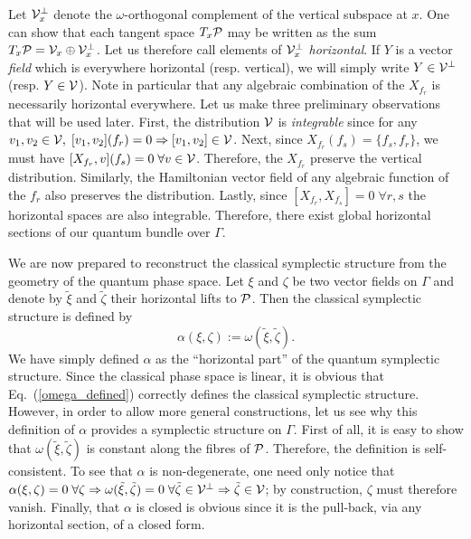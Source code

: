 \documentclass[12pt,aps,eqsecnum,tighten,nofootinbib]{revtex4-2}
\def\be{\begin{equation}}
\def\ee{\end{equation}}
\def\a{\alpha}
\def\P{{\cal P}}
\def\w{\omega}
\def\implies{\Rightarrow}
\newcommand{\eqn}[1]{Eq.~(\ref{#1})}
\newcommand{\hvf}[1]{{X_{#1}}}
\begin{document}
Let ${\cal V}_x^\perp$ denote the $\w$-orthogonal complement of the
vertical subspace at $x$.  One can show \cite{thesis} that each
tangent space $T_x\P$ may be written as the sum $T_x\P = {\cal V}_x
\oplus {\cal V}_x^\perp$.  Let us therefore call elements of ${\cal
V}_x^\perp$ {\em horizontal}.  If $Y$ is a vector {\em field} which is
everywhere horizontal (resp. vertical), we will simply write $Y \in
{\cal V}^\perp$ (resp. $Y \in {\cal V}$).  Note in particular that any
algebraic combination of the $\hvf{f_r}$ is necessarily horizontal
everywhere.  Let us make three preliminary observations that will be
used later.  First, the distribution ${\cal V}$ is {\em integrable}
since for any $v_1, v_2 \in {\cal V}, \; [v_1, v_2](f_r)=0 \implies
[v_1, v_2] \in {\cal V}$.  Next, since $\hvf{f_r}(f_s) = \{f_s,
f_r\}$, we must have $[\hvf{f_r}, v](f_s) = 0 \; \forall v\in{\cal
V}$.  Therefore, the $\hvf{f_r}$ preserve the vertical distribution.
Similarly, the Hamiltonian vector field of any algebraic function of
the $f_r$ also preserves the distribution.  Lastly, since $[\hvf{f_r},
\hvf{f_s}] = 0 \; \forall r,s$ the horizontal spaces are also
integrable.  Therefore, there exist global horizontal sections of our
quantum bundle over $\Gamma$.

We are now prepared to reconstruct the classical symplectic structure
from the geometry of the quantum phase space.  Let $\xi$ and $\zeta$
be two vector fields on $\Gamma$ and denote by $\tilde{\xi}$ and
$\tilde{\zeta}$ their horizontal lifts to $\P$.  Then the classical
symplectic structure is defined by \be \label{omega_defined} \a(\xi,
\zeta) := \w(\tilde{\xi}, \tilde{\zeta}).  \ee We have simply defined
$\a$ as the ``horizontal part'' of the quantum symplectic structure.
Since the classical phase space is linear, it is obvious that
\eqn{omega_defined} correctly defines the classical symplectic
structure.  However, in order to allow more general constructions, let
us see why this definition of $\a$ provides a symplectic structure on
$\Gamma$.  First of all, it is easy to show that $\w(\tilde{\xi},
\tilde{\zeta})$ is constant along the fibres of $\P$.  Therefore, the
definition is self-consistent.  To see that $\a$ is non-degenerate,
one need only notice that $\a(\xi, \zeta)=0 \; \forall \zeta \implies
\w(\tilde{\xi}, \tilde{\zeta}) = 0 \; \forall \tilde{\zeta} \in {\cal
V}^\perp \implies \tilde{\zeta} \in {\cal V}$; by construction,
$\zeta$ must therefore vanish.  Finally, that $\a$ is closed is
obvious since it is the pull-back, via any horizontal section, of a
closed form.
\end{document}
